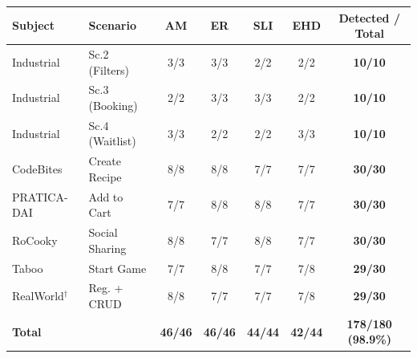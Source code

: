 \begin{tabular}{llccccc}
\toprule
\textbf{Subject} & \textbf{Scenario} & \textbf{AM} & \textbf{ER} & \textbf{SLI} & \textbf{EHD} & \textbf{Detected / Total} \\
\midrule
Industrial & Sc.2 (Filters) & 3/3 & 3/3 & 2/2 & 2/2 & \textbf{10/10} \\
Industrial & Sc.3 (Booking) & 2/2 & 3/3 & 3/3 & 2/2 & \textbf{10/10} \\
Industrial & Sc.4 (Waitlist) & 3/3 & 2/2 & 2/2 & 3/3 & \textbf{10/10} \\
CodeBites & Create Recipe & 8/8 & 8/8 & 7/7 & 7/7 & \textbf{30/30} \\
PRATICA-DAI & Add to Cart & 7/7 & 8/8 & 8/8 & 7/7 & \textbf{30/30} \\
RoCooky & Social Sharing & 8/8 & 7/7 & 8/8 & 7/7 & \textbf{30/30} \\
Taboo & Start Game & 7/7 & 8/8 & 7/7 & 7/8 & \textbf{29/30} \\
RealWorld$^\dagger$ & Reg. + CRUD & 8/8 & 7/7 & 7/7 & 7/8 & \textbf{29/30} \\
\midrule
\textbf{Total} & & \textbf{46/46} & \textbf{46/46} & \textbf{44/44} & \textbf{42/44} & \textbf{178/180 (98.9\%)} \\
\bottomrule
\end{tabular}

